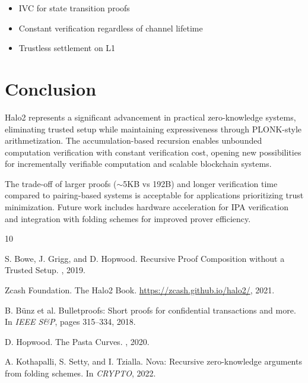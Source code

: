 \documentclass[11pt,a4paper]{article}
\begin{document}
\begin{itemize}
    \item IVC for state transition proofs
    \item Constant verification regardless of channel lifetime
    \item Trustless settlement on L1
\end{itemize}

\section{Conclusion}

Halo2 represents a significant advancement in practical zero-knowledge systems, eliminating trusted setup while maintaining expressiveness through PLONK-style arithmetization. The accumulation-based recursion enables unbounded computation verification with constant verification cost, opening new possibilities for incrementally verifiable computation and scalable blockchain systems.

The trade-off of larger proofs ($\sim$5KB vs 192B) and longer verification time compared to pairing-based systems is acceptable for applications prioritizing trust minimization. Future work includes hardware acceleration for IPA verification and integration with folding schemes for improved prover efficiency.


\begin{thebibliography}{10}

S. Bowe, J. Grigg, and D. Hopwood.
\newblock Recursive Proof Composition without a Trusted Setup.
, 2019.

Zcash Foundation.
\newblock The Halo2 Book.
\newblock \url{https://zcash.github.io/halo2/}, 2021.

B. B\"unz et al.
\newblock Bulletproofs: Short proofs for confidential transactions and more.
\newblock In {\em IEEE S\&P}, pages 315--334, 2018.

D. Hopwood.
\newblock The Pasta Curves.
, 2020.

A. Kothapalli, S. Setty, and I. Tzialla.
\newblock Nova: Recursive zero-knowledge arguments from folding schemes.
\newblock In {\em CRYPTO}, 2022.

\end{thebibliography}
\end{document}
